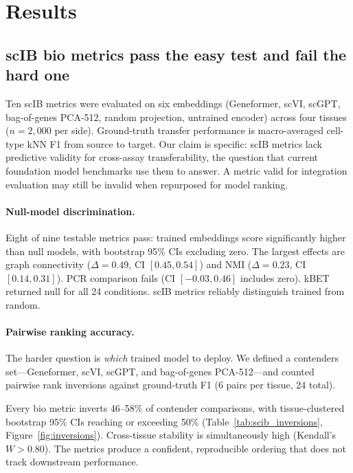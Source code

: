 \documentclass[11pt]{article}
\begin{document}
\section{Results}

\subsection{scIB bio metrics pass the easy test and fail the hard one}
\label{sec:scib}

Ten scIB metrics were evaluated on six embeddings (Geneformer, scVI, scGPT, bag-of-genes PCA-512, random projection, untrained encoder) across four tissues ($n = 2{,}000$ per side). Ground-truth transfer performance is macro-averaged cell-type kNN F1 from source to target. Our claim is specific: scIB metrics lack predictive validity for cross-assay transferability, the question that current foundation model benchmarks use them to answer. A metric valid for integration evaluation may still be invalid when repurposed for model ranking.

\paragraph{Null-model discrimination.} Eight of nine testable metrics pass: trained embeddings score significantly higher than null models, with bootstrap 95\% CIs excluding zero. The largest effects are graph connectivity ($\Delta = 0.49$, CI $[0.45, 0.54]$) and NMI ($\Delta = 0.23$, CI $[0.14, 0.31]$). PCR comparison fails (CI $[-0.03, 0.46]$ includes zero). kBET returned null for all 24 conditions. scIB metrics reliably distinguish trained from random.

\paragraph{Pairwise ranking accuracy.} The harder question is \emph{which} trained model to deploy. We defined a contenders set---Geneformer, scVI, scGPT, and bag-of-genes PCA-512---and counted pairwise rank inversions against ground-truth F1 (6 pairs per tissue, 24 total).

Every bio metric inverts 46--58\% of contender comparisons, with tissue-clustered bootstrap 95\% CIs reaching or exceeding 50\% (Table~\ref{tab:scib_inversions}, Figure~\ref{fig:inversions}). Cross-tissue stability is simultaneously high (Kendall's $W > 0.80$). The metrics produce a confident, reproducible ordering that does not track downstream performance.
\end{document}
